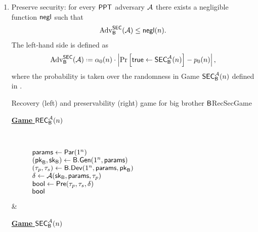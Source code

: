 \begin{defn}
\begin{enumerate}[1.]
\begin{boxfigTwo}{Distinguish game for weak/strong subversion.}{detectgame}
\begin{minipage}{0.45\textwidth}
\begin{description}
		If $b=0$: $(\ptrans,\strans)\leftarrow \dev(1^n,\params)$\\
		If $b=1$: $(\ptrans,\strans)\leftarrow \bbdev(1^n,\params,\bbpk)$ \\
		\Ret $(\ptrans,\strans)$
		\smallskip
  	\end{description}
\end{minipage}
     \\ \hline 
	 $\eve$ is allowed to make $t$ queries to the oracle $\oracle$. &
	 $\user$ is allowed to make $t$ queries to the oracle $\oracle$  \\
\end{boxfigTwo}
		\item Preserve security: for every $\mathsf{PPT}$ adversary $\mathcal{A}$ there exists a negligible function $\operatorname{\mathsf{negl}}$ such that
		\begin{align*}
			\operatorname{Adv}_{\mathsf{B}}^{\mathsf{SEC}}(\mathcal{A}) \leq \operatorname{\mathsf{negl}}(n).
		\end{align*}   
		The left-hand side is defined as
		\begin{align*}
			\adv_{\bb}^{\secgame}(\adve) \defeq \secf(n)\cdot\left\vert \prob{\true\leftarrow\secgame_{\bb}^{\adve}(n)} - \basep(n)\right\vert,
		\end{align*}
		where the probability is taken over the randomness in Game $\mathsf{SEC}_{\mathsf{B}}^{\mathcal{A}}(n)$ defined in .
		\begin{boxfigTwo}{Recovery (left) and preservability (right) game for big brother $\mathsf{B}$}{RecSecGame}
\begin{minipage}{0.45\textwidth}
    \smallskip
	\begin{description}
	\item[\underline{\textbf{Game} $\mathsf{REC}_{\mathsf{B}}^{\mathcal{A}}(n)$}] ~
 	
 		$\mathsf{params} \leftarrow \operatorname{\mathsf{Par}}(1^n)$ \\
 		$(\mathsf{pk}_{\mathsf{B}},\mathsf{sk}_{\mathsf{B}})\leftarrow \mathsf{B}.\mathsf{Gen}(1^n,\mathsf{params})$ \\
 		$(\ptrans,\strans)\leftarrow \bbdev(1^n,\params,\bbpk)$ \\
 		$\delta \leftarrow \mathcal{A}(\mathsf{sk}_{\mathsf{B}},\mathsf{params},\tau_p)$ \\
 		$\mathsf{bool} \leftarrow \operatorname{\mathsf{Pre}}(\tau_p,\tau_s,\delta)$ \\
		\Ret $\mathsf{bool}$
		\smallskip
  	\end{description}
\end{minipage}
    & 
\begin{minipage}{0.45\textwidth}
    \smallskip
	\begin{description}
	\item[\underline{\textbf{Game} $\mathsf{SEC}_{\mathsf{B}}^{\mathcal{A}}(n)$}] ~
 	

\end{description}
\end{minipage}
\end{boxfigTwo}
\end{enumerate}
\end{defn}
